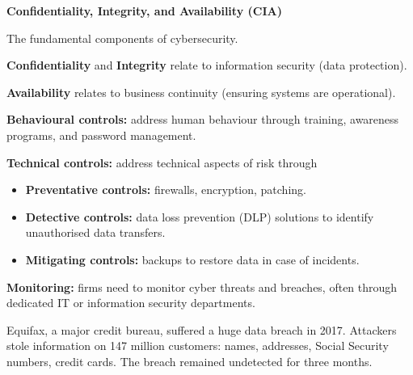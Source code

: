 \begin{orkeybox}
{\sffamily\bfseries\fontsize{8.6}{10}\selectfont\color{navy}Confidentiality,
Integrity, and Availability (CIA)}\par
\vspace{3pt}
The fundamental components of cybersecurity.
\begin{checks}
\item \textbf{Confidentiality} and \textbf{Integrity} relate to information
security (data protection).
\item \textbf{Availability} relates to business continuity (ensuring systems are
operational).
\end{checks}
\end{orkeybox}


\begin{lettered}
\item \textbf{Behavioural controls:} address human behaviour through training,
awareness programs, and password management.
\item \textbf{Technical controls:} address technical aspects of risk through
  \begin{itemize}
  \item \textbf{Preventative controls:} firewalls, encryption, patching.
  \item \textbf{Detective controls:} data loss prevention (DLP) solutions to
  identify unauthorised data transfers.
  \item \textbf{Mitigating controls:} backups to restore data in case of
  incidents.
  \end{itemize}
\item \textbf{Monitoring:} firms need to monitor cyber threats and breaches,
often through dedicated IT or information security departments.
\end{lettered}



\begin{orkeybox}
Equifax, a major credit bureau, suffered a huge data breach in 2017. Attackers
stole information on 147 million customers: names, addresses, Social Security
numbers, credit cards. The breach remained undetected for three months.
\end{orkeybox}

